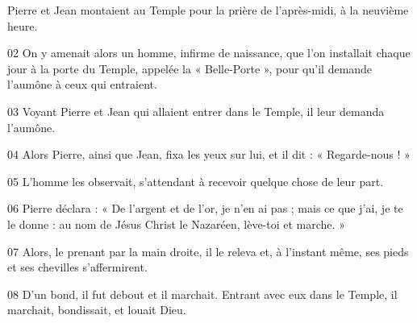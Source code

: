 Pierre et Jean montaient au Temple pour la prière de l’après-midi, à la neuvième heure.

02 On y amenait alors un homme, infirme de naissance, que l’on installait chaque jour à la porte du Temple, appelée la « Belle-Porte », pour qu’il demande l’aumône à ceux qui entraient.

03 Voyant Pierre et Jean qui allaient entrer dans le Temple, il leur demanda l’aumône.

04 Alors Pierre, ainsi que Jean, fixa les yeux sur lui, et il dit : « Regarde-nous ! »

05 L’homme les observait, s’attendant à recevoir quelque chose de leur part.

06 Pierre déclara : « De l’argent et de l’or, je n’en ai pas ; mais ce que j’ai, je te le donne : au nom de Jésus Christ le Nazaréen, lève-toi et marche. »

07 Alors, le prenant par la main droite, il le releva et, à l’instant même, ses pieds et ses chevilles s’affermirent.

08 D’un bond, il fut debout et il marchait. Entrant avec eux dans le Temple, il marchait, bondissait, et louait Dieu.
